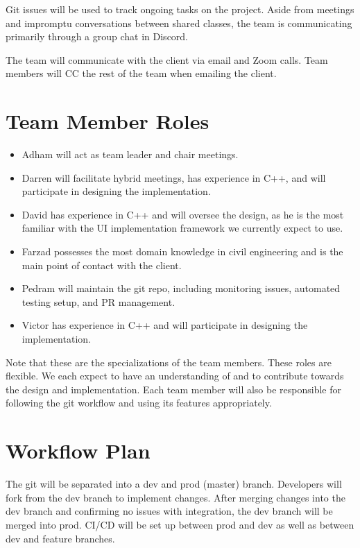 \documentclass{article}
\begin{document}
Git issues will be used to track ongoing tasks on the project. Aside from meetings and impromptu conversations between shared classes, the team is communicating primarily through a group chat in Discord.

The team will communicate with the client via email and Zoom calls. Team members will CC the rest of the team when emailing the client.

\section{Team Member Roles}

\begin{itemize}
	\item Adham will act as team leader and chair meetings.
	\item Darren will facilitate hybrid meetings, has experience in C++, and will participate in designing the implementation.
	\item David has experience in C++ and will oversee the design, as he is the most familiar with the UI implementation framework we currently expect to use.
	\item Farzad possesses the most domain knowledge in civil engineering and is the main point of contact with the client.
	\item Pedram will maintain the git repo, including monitoring issues, automated testing setup, and PR management.
	\item Victor has experience in C++ and will participate in designing the implementation.
\end{itemize}

Note that these are the specializations of the team members. These roles are flexible. We each expect to have an understanding of and to contribute towards the design and implementation. Each team member will also be responsible for following the git workflow and using its features appropriately. 

\section{Workflow Plan}

The git will be separated into a dev and prod (master) branch. Developers will fork from the dev branch to implement changes. After merging changes into the dev branch and confirming no issues with integration, the dev branch will be merged into prod. CI/CD will be set up between prod and dev as well as between dev and feature branches.
\end{document}
